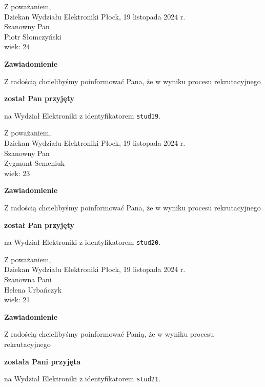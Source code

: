 \documentclass[12pt,a4paper]{article}
\begin{document}
\noindent
Z poważaniem,\\
Dziekan
Wydziału Elektroniki
\newpage
\hfill Płock, 19 listopada 2024 r.\\ 
\noindent 
Szanowny Pan \\
Piotr Słomczyński \\
wiek: 24

\bigskip

\begin{center}
{\Large\textbf{Zawiadomienie}}
\end{center}
\bigskip
Z radością chcielibyśmy poinformować Pana, że w wyniku procesu rekrutacyjnego
\begin{center}
\textsf{\textbf{został Pan przyjęty}} 
\end{center}
na Wydział Elektroniki z identyfikatorem \verb|stud19|.
\vspace{2cm}

\noindent
Z poważaniem,\\
Dziekan
Wydziału Elektroniki
\newpage
\hfill Płock, 19 listopada 2024 r.\\ 
\noindent 
Szanowny Pan \\
Zygmunt Semeniuk  \\
wiek: 23

\bigskip

\begin{center}
{\Large\textbf{Zawiadomienie}}
\end{center}
\bigskip
Z radością chcielibyśmy poinformować Pana, że w wyniku procesu rekrutacyjnego
\begin{center}
\textsf{\textbf{został Pan przyjęty}} 
\end{center}
na Wydział Elektroniki z identyfikatorem \verb|stud20|.
\vspace{2cm}

\noindent
Z poważaniem,\\
Dziekan
Wydziału Elektroniki
\newpage
\hfill Płock, 19 listopada 2024 r.\\ 
\noindent 
Szanowna Pani \\
Helena Urbańczyk \\
wiek: 21

\bigskip

\begin{center}
{\Large\textbf{Zawiadomienie}}
\end{center}
\bigskip
Z radością chcielibyśmy poinformować Panią, że w wyniku procesu rekrutacyjnego
\begin{center}
\textsf{\textbf{została Pani przyjęta}} 
\end{center}
na Wydział Elektroniki z identyfikatorem \verb|stud21|.
\vspace{2cm}
\end{document}
